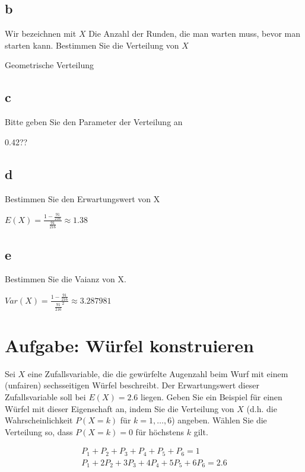 \subsection{b}

Wir bezeichnen mit $X$ Die Anzahl der Runden, die man warten muss, bevor man
starten kann. Bestimmen Sie die Verteilung von $X$

Geometrische Verteilung

\subsection{c}

Bitte geben Sie den Parameter der Verteilung an

0.42??

\subsection{d}

Bestimmen Sie den Erwartungswert von X

$E(X) = \frac{1 - \frac{91}{216}}{\frac{91}{216}} \approx 1.38$

\subsection{e}

Bestimmen Sie die Vaianz von X.

$Var(X) = \frac{1 - \frac{91}{216}}{\frac{91}{216}^2} \approx 3.287981$

\section{Aufgabe: Würfel konstruieren}

Sei $X$ eine Zufallsvariable, die die gewürfelte Augenzahl beim Wurf mit einem
(unfairen) sechsseitigen Würfel beschreibt. Der Erwartungswert dieser
Zufallsvariable soll bei $E(X) = 2.6$ liegen. Geben Sie ein Beispiel für einen
Würfel mit dieser Eigenschaft an, indem Sie die Verteilung von $X$ (d.h. die
Wahrscheinlichkeit $P(X = k)$ für $k = 1, \dots, 6$) angeben. Wählen Sie die
Verteilung so, dass $P(X = k) = 0$ für höchstens $k$ gilt.

\begin{align*}
    P_1 + P_2 + P_3 + P_4 + P_5 + P_6 = 1        \\
    P_1 + 2P_2 + 3P_3 + 4P_4 + 5P_5 + 6P_6 = 2.6 \\
\end{align*}

